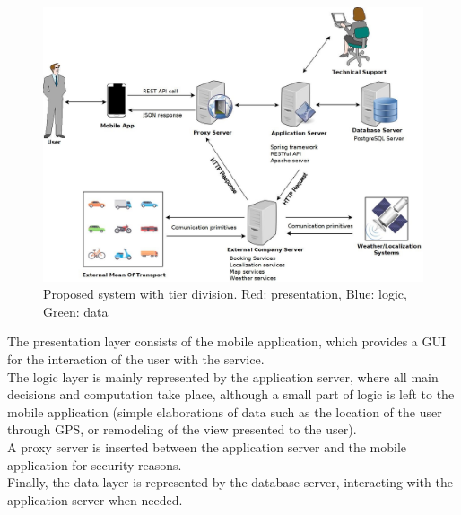 \documentclass[a4paper,leqno]{article}
\begin{document}
\begin{figure}[!h]
	\begin{centering}
		\includegraphics[scale=0.3]{ProposedSystemDiagram_29102017_1}
	\end{centering}
	\caption{Proposed system with tier division. Red: presentation, Blue: logic, Green: data}
\end{figure}

The presentation layer consists of the mobile application, which provides a GUI for the interaction of the user with the service.\\
The logic layer is mainly represented by the application server, where all main decisions and computation take place, although a small part of logic is left to the mobile application (simple elaborations of data such as the location of the user through GPS, or remodeling of the view presented to the user).\\
A proxy server is inserted between the application server and the mobile application for security reasons.\\
Finally, the data layer is represented by the database server, interacting with the application server when needed.

\newpage
\end{document}

